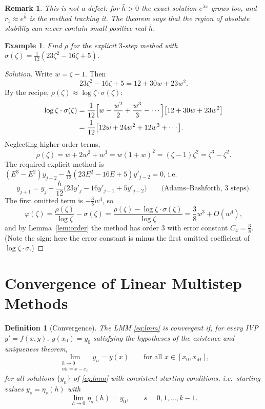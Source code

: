 \documentclass[11pt,a4paper]{article}
\numberwithin{equation}{section}
\theoremstyle{spacedplain}
\theoremstyle{spaceddefinition}
\newtheorem{definition}[theorem]{Definition}
\newtheorem{example}[theorem]{Example}
\theoremstyle{spacedremark}
\newtheorem{remark}[theorem]{Remark}
\newcommand{\hb}{\bar h}
\begin{document}
\begin{remark}
This is not a defect: for \(\hb>0\) the exact solution \(e^{\lambda x}\)
grows too, and \(r_1\approx e^{\hb}\) is the method tracking it.  The
theorem says that the region of absolute stability can never contain
small positive real \(\hb\).
\end{remark}

\begin{example}
Find \(\rho\) for the explicit \(3\)-step method with
\(\sigma(\zeta)=\frac1{12}(23\zeta^2-16\zeta+5)\).
\end{example}

\begin{proof}[Solution]
Write \(w=\zeta-1\).  Then
\[
  23\zeta^2-16\zeta+5=12+30w+23w^2 .
\]
By the recipe, \(\rho(\zeta)\approx\log\zeta\cdot\sigma(\zeta)\):
\begin{align*}
  \log\zeta\cdot\sigma(\zeta)
  &=\frac1{12}\Bigl[w-\frac{w^2}2+\frac{w^3}3-\cdots\Bigr]
    \bigl[12+30w+23w^2\bigr]\\
  &=\frac1{12}\bigl[12w+24w^2+12w^3+\cdots\bigr].
\end{align*}
Neglecting higher-order terms,
\[
  \rho(\zeta)=w+2w^2+w^3=w(1+w)^2=(\zeta-1)\zeta^2=\zeta^3-\zeta^2 .
\]
The required explicit method is
\((E^3-E^2)y_{j-2}-\frac h{12}(23E^2-16E+5)y'_{j-2}=0\), i.e.
\[
  y_{j+1}=y_j+\frac h{12}\bigl(23y'_j-16y'_{j-1}+5y'_{j-2}\bigr)
  \qquad\text{(Adams--Bashforth, 3 steps).}
\]
The first omitted term is \(-\frac38w^4\), so
\[
  \varphi(\zeta)=\frac{\rho(\zeta)}{\log\zeta}-\sigma(\zeta)
  =\frac{\rho(\zeta)-\log\zeta\cdot\sigma(\zeta)}{\log\zeta}
  =\frac38w^3+O(w^4),
\]
and by Lemma~\ref{lem:order} the method has order \(3\) with error
constant \(C_4=\frac38\).  (Note the sign: here the error constant is
minus the first omitted coefficient of \(\log\zeta\cdot\sigma\).)
\end{proof}

\section{Convergence of Linear Multistep Methods}

\begin{definition}[Convergence]
The LMM \eqref{eq:lmm} is \emph{convergent} if, for every IVP
\(y'=f(x,y)\), \(y(x_0)=y_0\) satisfying the hypotheses of the
existence and uniqueness theorem,
\[
  \lim_{\substack{h\to0\\ nh=x-x_0}}y_n=y(x)
  \qquad\text{for all }x\in[x_0,x_M],
\]
for all solutions \(\{y_n\}\) of \eqref{eq:lmm} with \emph{consistent
starting conditions}, i.e.\ starting values \(y_s=\eta_s(h)\) with
\[
  \lim_{h\to0}\eta_s(h)=y_0,\qquad s=0,1,\dots,k-1.
\]
\end{definition}
\end{document}
